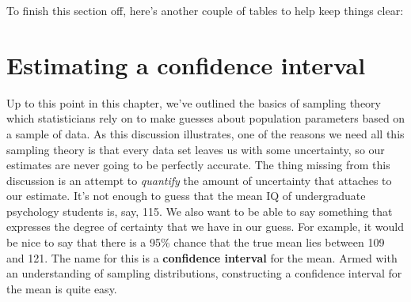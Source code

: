 \documentclass[
]{book}
\theoremstyle{definition}
\theoremstyle{definition}
\theoremstyle{definition}
\theoremstyle{definition}
\theoremstyle{remark}
\begin{document}
To finish this section off, here's another couple of tables to help keep things clear:

\begin{table}
\centering
{}
\end{table}

\hypertarget{ci}{%
\section{Estimating a confidence interval}\label{ci}}

Up to this point in this chapter, we've outlined the basics of sampling theory which statisticians rely on to make guesses about population parameters based on a sample of data. As this discussion illustrates, one of the reasons we need all this sampling theory is that every data set leaves us with some uncertainty, so our estimates are never going to be perfectly accurate. The thing missing from this discussion is an attempt to \emph{quantify} the amount of uncertainty that attaches to our estimate. It's not enough to guess that the mean IQ of undergraduate psychology students is, say, 115. We also want to be able to say something that expresses the degree of certainty that we have in our guess. For example, it would be nice to say that there is a 95\% chance that the true mean lies between 109 and 121. The name for this is a \textbf{confidence interval} for the mean. Armed with an understanding of sampling distributions, constructing a confidence interval for the mean is quite easy.
\end{document}
